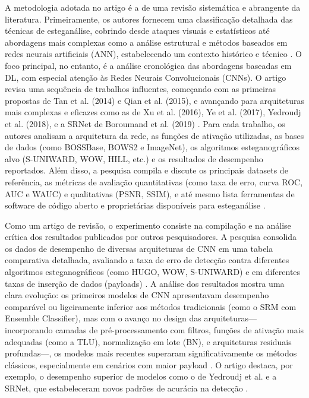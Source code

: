 \documentclass[12pt]{article}
\begin{document}
A metodologia adotada no artigo é a de uma revisão sistemática e abrangente da
literatura. Primeiramente, os autores fornecem uma classificação detalhada das
técnicas de esteganálise, cobrindo desde ataques visuais e estatísticos até
abordagens mais complexas como a análise estrutural e métodos baseados em redes
neurais artificiais (ANN), estabelecendo um contexto histórico e técnico
\cite{farooq2023systematic}. O foco principal, no entanto, é a análise
cronológica das abordagens baseadas em DL, com especial atenção às Redes
Neurais Convolucionais (CNNs). O artigo revisa uma sequência de trabalhos
influentes, começando com as primeiras propostas de Tan et al. (2014) e Qian et
al. (2015), e avançando para arquiteturas mais complexas e eficazes como as de
Xu et al. (2016), Ye et al. (2017), Yedroudj et al. (2018), e a SRNet de
Boroumand et al. (2019) \cite{farooq2023systematic}. Para cada trabalho, os
autores analisam a arquitetura da rede, as funções de ativação utilizadas, as
bases de dados (como BOSSBase, BOWS2 e ImageNet), os algoritmos
esteganográficos alvo (S-UNIWARD, WOW, HILL, etc.) e os resultados de
desempenho reportados. Além disso, a pesquisa compila e discute os principais
datasets de referência, as métricas de avaliação quantitativas (como taxa de
erro, curva ROC, AUC e WAUC) e qualitativas (PSNR, SSIM), e até mesmo lista
ferramentas de software de código aberto e proprietárias disponíveis para
esteganálise \cite{farooq2023systematic}.

Como um artigo de revisão, o experimento consiste na compilação e na análise
crítica dos resultados publicados por outros pesquisadores. A pesquisa
consolida os dados de desempenho de diversas arquiteturas de CNN em uma tabela
comparativa detalhada, avaliando a taxa de erro de detecção contra diferentes
algoritmos esteganográficos (como HUGO, WOW, S-UNIWARD) e em diferentes taxas
de inserção de dados (payloads) \cite{farooq2023systematic}. A análise dos
resultados mostra uma clara evolução: os primeiros modelos de CNN apresentavam
desempenho comparável ou ligeiramente inferior aos métodos tradicionais (como o
SRM com Ensemble Classifier), mas com o avanço no design das
arquiteturas—incorporando camadas de pré-processamento com filtros, funções de
ativação mais adequadas (como a TLU), normalização em lote (BN), e arquiteturas
residuais profundas—, os modelos mais recentes superaram significativamente os
métodos clássicos, especialmente em cenários com maior payload
\cite{farooq2023systematic}. O artigo destaca, por exemplo, o desempenho
superior de modelos como o de Yedroudj et al. e a SRNet, que estabeleceram
novos padrões de acurácia na detecção \cite{farooq2023systematic}.
\end{document}
